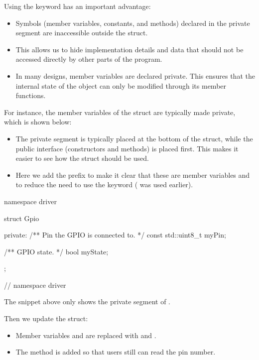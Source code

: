 \noindent Using the  keyword has an important advantage:
\begin{itemize}
  \item Symbols (member variables, constants, and methods) declared in the private segment are
    inaccessible outside the struct.
  \item This allows us to hide implementation details and data that should not be accessed directly
    by other parts of the program.
  \item In many designs, member variables are declared private. This ensures that the internal
    state of the object can only be modified through its member functions.
\end{itemize}
For instance, the member variables of the  struct are typically made private,
which is shown below:
\begin{itemize}
  \item The private segment is typically placed at the bottom of the struct, while the public
    interface (constructors and methods) is placed first. This makes it easier to see how the
    struct should be used.
  \item Here we add the  prefix to make it clear that these are member variables and to
    reduce the need to use the  keyword ( was used earlier).
\end{itemize}

\begin{cppcode}
namespace driver
{
struct Gpio
{
private:
    /** Pin the GPIO is connected to. */
    const std::uint8_t myPin;

    /** GPIO state. */
    bool myState;
};
} // namespace driver
\end{cppcode}

\note The snippet above only shows the private segment of .

Then we update the struct:
\begin{itemize}
  \item Member variables  and  are replaced with  and
    .
  \item The  method is added so that users still can read the pin number.
\end{itemize}


